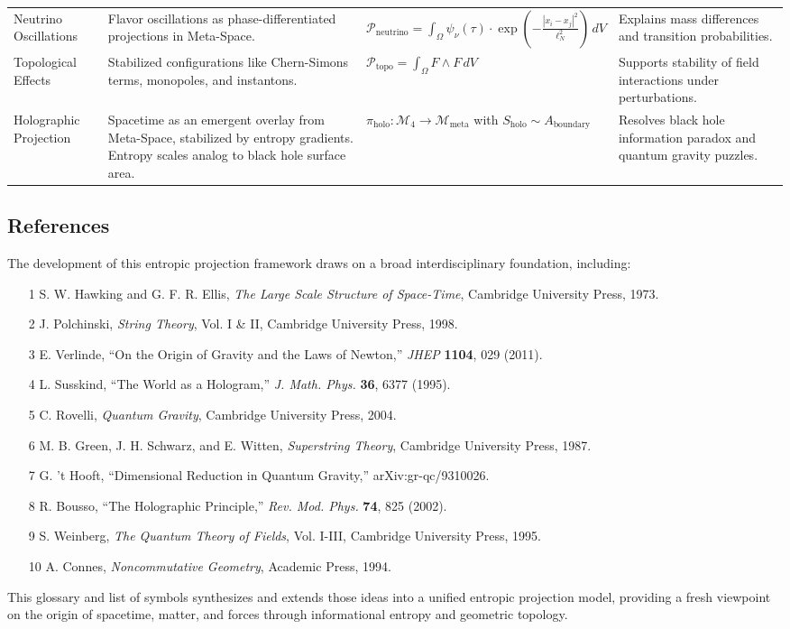 \documentclass[10.5pt,a4paper]{article}
\begin{document}
{\begin{longtable}{p{3cm} p{6.5cm} p{4cm} p{4cm}}
Neutrino Oscillations & Flavor oscillations as phase-differentiated projections in Meta-Space. & \( \mathcal{P}_{\text{neutrino}} = \int_\Omega \psi_\nu(\tau) \cdot \exp\left(-\frac{|x_i - x_j|^2}{\ell_N^2}\right) \, dV \) & Explains mass differences and transition probabilities. \\

Topological Effects & Stabilized configurations like Chern-Simons terms, monopoles, and instantons. & \( \mathcal{P}_{\text{topo}} = \int_\Omega F \wedge F \, dV \) & Supports stability of field interactions under perturbations. \\

Holographic Projection & Spacetime as an emergent overlay from Meta-Space, stabilized by entropy gradients. Entropy scales analog to black hole surface area. & \( \pi_{\text{holo}}: \mathcal{M}_4 \rightarrow \mathcal{M}_{\text{meta}} \) with \( S_{\text{holo}} \sim A_{\text{boundary}} \) & Resolves black hole information paradox and quantum gravity puzzles. \\

\end{longtable}
}
\subsection{References}

The development of this entropic projection framework draws on a broad interdisciplinary foundation, including:

\begin{itemize}
\item [1] S. W. Hawking and G. F. R. Ellis, \textit{The Large Scale Structure of Space-Time}, Cambridge University Press, 1973.
\item [2] J. Polchinski, \textit{String Theory}, Vol. I \& II, Cambridge University Press, 1998.
\item [3] E. Verlinde, ``On the Origin of Gravity and the Laws of Newton,'' \textit{JHEP} \textbf{1104}, 029 (2011).
\item [4] L. Susskind, ``The World as a Hologram,'' \textit{J. Math. Phys.} \textbf{36}, 6377 (1995).
\item [5] C. Rovelli, \textit{Quantum Gravity}, Cambridge University Press, 2004.
\item [6] M. B. Green, J. H. Schwarz, and E. Witten, \textit{Superstring Theory}, Cambridge University Press, 1987.
\item [7] G. 't Hooft, ``Dimensional Reduction in Quantum Gravity,'' arXiv:gr-qc/9310026.
\item [8] R. Bousso, ``The Holographic Principle,'' \textit{Rev. Mod. Phys.} \textbf{74}, 825 (2002).
\item [9] S. Weinberg, \textit{The Quantum Theory of Fields}, Vol. I-III, Cambridge University Press, 1995.
\item [10] A. Connes, \textit{Noncommutative Geometry}, Academic Press, 1994.
\end{itemize}

This glossary and list of symbols synthesizes and extends those ideas into a unified entropic projection model, providing a fresh viewpoint on the origin of spacetime, matter, and forces through informational entropy and geometric topology.
\end{document}
